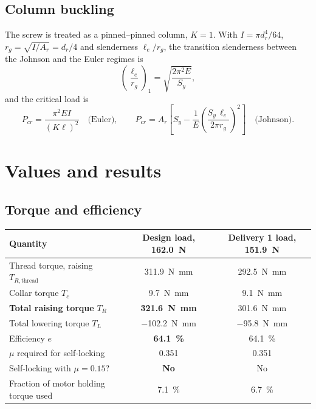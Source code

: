\documentclass[11pt]{article}
\begin{document}
\subsection{Column buckling}

The screw is treated as a pinned--pinned column, $K=1$. With
$I=\pi d_r^4/64$, $r_g=\sqrt{I/A_r}=d_r/4$ and slenderness $\ell_e/r_g$, the transition
slenderness between the Johnson and the Euler regimes is
\begin{equation}
\left(\frac{\ell_e}{r_g}\right)_{\!1}=\sqrt{\frac{2\pi^2E}{S_y}} ,
\end{equation}
and the critical load is
\begin{equation}
P_{cr}=\frac{\pi^2EI}{(K\ell)^2}\quad\text{(Euler)},
\qquad
P_{cr}=A_r\left[S_y-\frac{1}{E}\left(\frac{S_y\,\ell_e}{2\pi r_g}\right)^{2}\right]\quad\text{(Johnson)} .
\end{equation}

\section{Values and results}\label{sec:scr-res}

\subsection{Torque and efficiency}

\begin{center}
\begin{tabular}{@{}lcc@{}}
\toprule
\textbf{Quantity} & \textbf{Design load, \SI{162.0}{\newton}} & \textbf{Delivery 1 load, \SI{151.9}{\newton}} \\
\midrule
Thread torque, raising $T_{R,\text{thread}}$ & \SI{311.9}{\newton\milli\metre} & \SI{292.5}{\newton\milli\metre} \\
Collar torque $T_c$                          & \SI{9.7}{\newton\milli\metre}   & \SI{9.1}{\newton\milli\metre} \\
\textbf{Total raising torque} $T_R$          & \textbf{\SI{321.6}{\newton\milli\metre}} & \SI{301.6}{\newton\milli\metre} \\
Total lowering torque $T_L$                  & \SI{-102.2}{\newton\milli\metre} & \SI{-95.8}{\newton\milli\metre} \\
Efficiency $e$                               & \textbf{\SI{64.1}{\percent}} & \SI{64.1}{\percent} \\
$\mu$ required for self-locking              & 0.351 & 0.351 \\
Self-locking with $\mu=0.15$?                & \textbf{No} & No \\
Fraction of motor holding torque used        & \SI{7.1}{\percent} & \SI{6.7}{\percent} \\
\bottomrule
\end{tabular}
\end{center}
\end{document}
